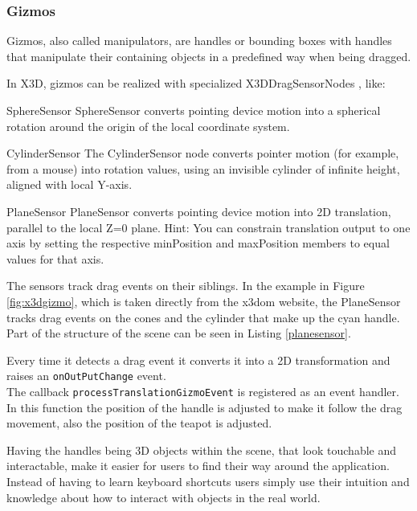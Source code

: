 \subsubsection{Gizmos}\label{gizmos}

Gizmos, also called manipulators, are handles or bounding boxes with
handles that manipulate their containing objects in a predefined way when
being dragged. \cite{wikigizmo}

In \gls{X3D}, gizmos can be realized with specialized X3DDragSensorNodes \cite{x3ddragsensornode}, like:

\begin{description*}
\item[SphereSensor]
  SphereSensor converts pointing device motion into a spherical rotation around the origin of the local coordinate system. \cite{spheresensor}
\item[CylinderSensor]
  The CylinderSensor node converts pointer motion (for example, from a mouse) into rotation values, using an invisible cylinder of infinite height, aligned with local Y-axis. \cite{cylindersensor}
\item[PlaneSensor]
  PlaneSensor converts pointing device motion into 2D translation, parallel to the local Z=0 plane. Hint: You can constrain translation output to one axis by setting the respective minPosition and maxPosition members to equal values for that axis. \cite{planesensor}
\end{description*}

The sensors track drag events on their siblings. In the example in Figure
\ref{fig:x3dgizmo}, which is taken directly from the x3dom website, the
PlaneSensor tracks drag events on the cones and the cylinder that make up the
cyan handle. Part of the structure of the scene can be seen in Listing
\ref{planesensor}.

Every time it detects a drag event it converts it into a 2D
transformation and raises an \texttt{onOutPutChange} event.\\
The callback \texttt{processTranslationGizmoEvent} is registered as an event handler.
In this function the position of the handle is adjusted to make it
follow the drag movement, also the position of the teapot is adjusted.

Having the handles being \gls{3D} objects within the scene, that look
touchable and interactable, make it easier for users to find their way
around the application. Instead of having to learn keyboard shortcuts
users simply use their intuition and knowledge about how to interact with
objects in the real world.

